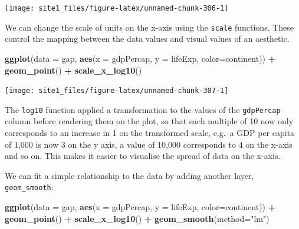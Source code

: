 \documentclass[]{book}
\newenvironment{Shaded}{\begin{snugshade}}{\end{snugshade}}
\newcommand{\KeywordTok}[1]{\textcolor[rgb]{0.13,0.29,0.53}{\textbf{#1}}}
\newcommand{\DataTypeTok}[1]{\textcolor[rgb]{0.13,0.29,0.53}{#1}}
\newcommand{\StringTok}[1]{\textcolor[rgb]{0.31,0.60,0.02}{#1}}
\newcommand{\OperatorTok}[1]{\textcolor[rgb]{0.81,0.36,0.00}{\textbf{#1}}}
\newcommand{\NormalTok}[1]{#1}
\begin{document}
\begin{center}\texttt{[image: site1\_files/figure-latex/unnamed-chunk-306-1]} \end{center}

We can change the scale of units on the x-axis using the \texttt{scale}
functions. These control the mapping between the data values and visual
values of an aesthetic.

\begin{Shaded}
\begin{Highlighting}[]
\KeywordTok{ggplot}\NormalTok{(}\DataTypeTok{data =}\NormalTok{ gap, }\KeywordTok{aes}\NormalTok{(}\DataTypeTok{x =}\NormalTok{ gdpPercap, }\DataTypeTok{y =}\NormalTok{ lifeExp, }\DataTypeTok{color=}\NormalTok{continent)) }\OperatorTok{+}\StringTok{ }
\StringTok{  }\KeywordTok{geom_point}\NormalTok{() }\OperatorTok{+}\StringTok{ }
\StringTok{  }\KeywordTok{scale_x_log10}\NormalTok{()}
\end{Highlighting}
\end{Shaded}

\begin{center}\texttt{[image: site1\_files/figure-latex/unnamed-chunk-307-1]} \end{center}

The \texttt{log10} function applied a transformation to the values of
the \texttt{gdpPercap} column before rendering them on the plot, so that
each multiple of 10 now only corresponds to an increase in 1 on the
transformed scale, e.g.~a GDP per capita of 1,000 is now 3 on the y
axis, a value of 10,000 corresponds to 4 on the x-axis and so on. This
makes it easier to visualise the spread of data on the x-axis.

We can fit a simple relationship to the data by adding another layer,
\texttt{geom\_smooth}:

\begin{Shaded}
\begin{Highlighting}[]
\KeywordTok{ggplot}\NormalTok{(}\DataTypeTok{data =}\NormalTok{ gap, }\KeywordTok{aes}\NormalTok{(}\DataTypeTok{x =}\NormalTok{ gdpPercap, }\DataTypeTok{y =}\NormalTok{ lifeExp, }\DataTypeTok{color=}\NormalTok{continent)) }\OperatorTok{+}\StringTok{ }
\StringTok{  }\KeywordTok{geom_point}\NormalTok{() }\OperatorTok{+}\StringTok{ }
\StringTok{  }\KeywordTok{scale_x_log10}\NormalTok{() }\OperatorTok{+}\StringTok{ }
\StringTok{  }\KeywordTok{geom_smooth}\NormalTok{(}\DataTypeTok{method=}\StringTok{"lm"}\NormalTok{)}
\end{Highlighting}
\end{Shaded}
\end{document}
